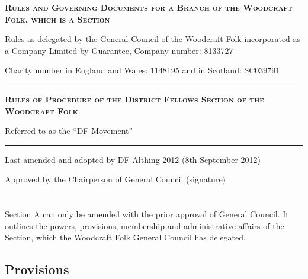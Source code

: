 \documentclass[a4paper, 12pt]{report}
\newcommand{\HRule}{\rule{\linewidth}{0.5mm}}
\begin{document}
\begin{titlepage}
\begin{center}

\doublespacing
\vspace*{1.5cm}

\textsc{\textbf{ \LARGE Rules and Governing Documents for a Branch of the Woodcraft Folk, which is a Section }}

\vspace{1.5cm}

Rules as delegated by the General Council of the Woodcraft Folk incorporated as a Company Limited by Guarantee, Company number: 8133727

Charity number in England and Wales: 1148195 and in Scotland: SC039791

\vspace{1.5cm}

\HRule

\vspace{1.5cm}

\textsc{\textbf{\Large Rules of Procedure of the District Fellows Section of the Woodcraft Folk }}

Referred to as the ``DF Movement''

\vspace{1.5cm}

\HRule

\vspace{3cm}

Last amended and adopted by DF Althing 2012 (8th September 2012)

\vspace{0.5cm}

Approved by the Chairperson of General Council (signature) \underline{ \hspace{5cm} }

\end{center}
\end{titlepage}

\tableofcontents

\renewcommand{\chaptername}{Section}
\chapter{}
Section A can only be amended with the prior approval of General Council. It outlines the powers, provisions, membership and administrative affairs of the Section, which the Woodcraft Folk General Council has delegated.

\section{Provisions}
\label{sec:provisions}
\end{document}
